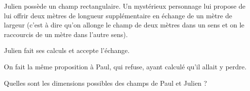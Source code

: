 
\begin{exercice}\label{exo2smath-0176}

Julien possède un champ rectangulaire. Un mystérieux personnage lui propose de lui offrir deux mètres de longueur supplémentaire en échange de un mètre de largeur (c'est à dire qu'on allonge le champ de deux mètres dans un sens et on le raccourcis de un mètre dans l'autre sens).

Julien fait ses calculs et accepte l'échange.

On fait la même proposition à Paul, qui refuse, ayant calculé qu'il allait y perdre.

Quelles sont les dimensions possibles des champs de Paul et Julien ?


\end{exercice}

